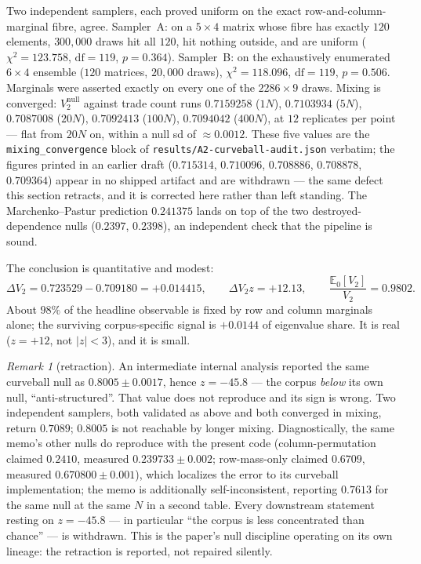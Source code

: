 \documentclass[11pt,a4paper]{article}
\theoremstyle{plain}
\theoremstyle{remark}
\newtheorem{remark}{Remark}
\theoremstyle{plain}
\begin{document}
Two independent samplers, each proved uniform on the exact row-and-column-marginal fibre, agree. Sampler~A: on a $5\times4$ matrix whose fibre has exactly $120$ elements, $300{,}000$ draws hit all $120$, hit nothing outside, and are uniform ($\chi^2=123.758$, $\mathrm{df}=119$, $p=0.364$). Sampler~B: on the exhaustively enumerated $6\times4$ ensemble ($120$ matrices, $20{,}000$ draws), $\chi^2=118.096$, $\mathrm{df}=119$, $p=0.506$. Marginals were asserted exactly on every one of the $2286\times9$ draws. Mixing is converged: $V_2^{\mathrm{null}}$ against trade count runs $0.7159258$ ($1N$), $0.7103934$ ($5N$), $0.7087008$ ($20N$), $0.7092413$ ($100N$), $0.7094042$ ($400N$), at $12$ replicates per point --- flat from $20N$ on, within a null sd of $\approx0.0012$. These five values are the \texttt{mixing\_convergence} block of \texttt{results/A2-curveball-audit.json} verbatim; the figures printed in an earlier draft ($0.715314$, $0.710096$, $0.708886$, $0.708878$, $0.709364$) appear in no shipped artifact and are withdrawn --- the same defect this section retracts, and it is corrected here rather than left standing. The Marchenko--Pastur prediction $0.241375$ \citep{mp1967} lands on top of the two destroyed-dependence nulls ($0.2397$, $0.2398$), an independent check that the pipeline is sound.

The conclusion is quantitative and modest:
\begin{equation}
\Delta V_2=0.723529-0.709180=+0.014415,\qquad \Delta V_2z=+12.13,\qquad \frac{\mathbb{E}_0[V_2]}{V_2}=0.9802 .
\label{eq:yubios-residual}
\end{equation}
About $98\%$ of the headline observable is fixed by row and column marginals alone; the surviving corpus-specific signal is $+0.0144$ of eigenvalue share. It is real ($z=+12$, not $|z|<3$), and it is small.

\begin{remark}[retraction]
\label{rem:retraction}
An intermediate internal analysis reported the same curveball null as $0.8005\pm0.0017$, hence $z=-45.8$ --- the corpus \emph{below} its own null, ``anti-structured''. That value does not reproduce and its sign is wrong. Two independent samplers, both validated as above and both converged in mixing, return $0.7089$; $0.8005$ is not reachable by longer mixing. Diagnostically, the same memo's other nulls do reproduce with the present code (column-permutation claimed $0.2410$, measured $0.239733\pm0.002$; row-mass-only claimed $0.6709$, measured $0.670800\pm0.001$), which localizes the error to its curveball implementation; the memo is additionally self-inconsistent, reporting $0.7613$ for the same null at the same $N$ in a second table. Every downstream statement resting on $z=-45.8$ --- in particular ``the corpus is less concentrated than chance'' --- is withdrawn. This is the paper's null discipline operating on its own lineage: the retraction is reported, not repaired silently.
\end{remark}
\end{document}
